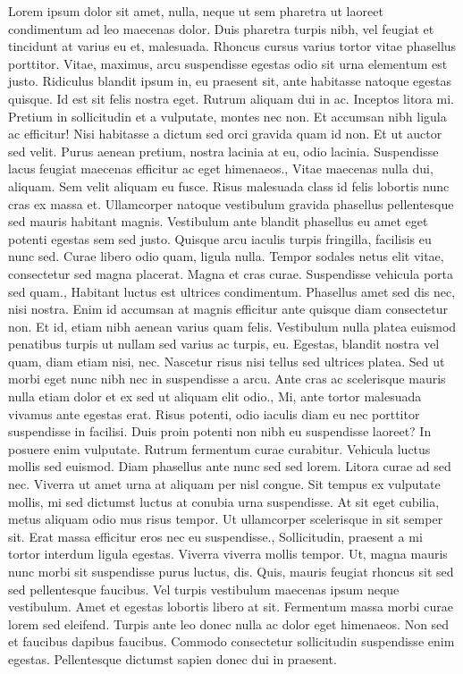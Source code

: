 \documentclass{source/tex/templates/maththesis}
\begin{document}
Lorem ipsum dolor sit amet, nulla, neque ut sem pharetra ut laoreet condimentum ad leo maecenas dolor. Duis pharetra turpis nibh, vel feugiat et tincidunt at varius eu et, malesuada. Rhoncus cursus varius tortor vitae phasellus porttitor. Vitae, maximus, arcu suspendisse egestas odio sit urna elementum est justo. Ridiculus blandit ipsum in, eu praesent sit, ante habitasse natoque egestas quisque. Id est sit felis nostra eget. Rutrum aliquam dui in ac. Inceptos litora mi. Pretium in sollicitudin et a vulputate, montes nec non. Et accumsan nibh ligula ac efficitur! Nisi habitasse a dictum sed orci gravida quam id non. Et ut auctor sed velit. Purus aenean pretium, nostra lacinia at eu, odio lacinia. Suspendisse lacus feugiat maecenas efficitur ac eget himenaeos., Vitae maecenas nulla dui, aliquam. Sem velit aliquam eu fusce. Risus malesuada class id felis lobortis nunc cras ex massa et. Ullamcorper natoque vestibulum gravida phasellus pellentesque sed mauris habitant magnis. Vestibulum ante blandit phasellus eu amet eget potenti egestas sem sed justo. Quisque arcu iaculis turpis fringilla, facilisis eu nunc sed. Curae libero odio quam, ligula nulla. Tempor sodales netus elit vitae, consectetur sed magna placerat. Magna et cras curae. Suspendisse vehicula porta sed quam., Habitant luctus est ultrices condimentum. Phasellus amet sed dis nec, nisi nostra. Enim id accumsan at magnis efficitur ante quisque diam consectetur non. Et id, etiam nibh aenean varius quam felis. Vestibulum nulla platea euismod penatibus turpis ut nullam sed varius ac turpis, eu. Egestas, blandit nostra vel quam, diam etiam nisi, nec. Nascetur risus nisi tellus sed ultrices platea. Sed ut morbi eget nunc nibh nec in suspendisse a arcu. Ante cras ac scelerisque mauris nulla etiam dolor et ex sed ut aliquam elit odio., Mi, ante tortor malesuada vivamus ante egestas erat. Risus potenti, odio iaculis diam eu nec porttitor suspendisse in facilisi. Duis proin potenti non nibh eu suspendisse laoreet? In posuere enim vulputate. Rutrum fermentum curae curabitur. Vehicula luctus mollis sed euismod. Diam phasellus ante nunc sed sed lorem. Litora curae ad sed nec. Viverra ut amet urna at aliquam per nisl congue. Sit tempus ex vulputate mollis, mi sed dictumst luctus at conubia urna suspendisse. At sit eget cubilia, metus aliquam odio mus risus tempor. Ut ullamcorper scelerisque in sit semper sit. Erat massa efficitur eros nec eu suspendisse., Sollicitudin, praesent a mi tortor interdum ligula egestas. Viverra viverra mollis tempor. Ut, magna mauris nunc morbi sit suspendisse purus luctus, dis. Quis, mauris feugiat rhoncus sit sed sed pellentesque faucibus. Vel turpis vestibulum maecenas ipsum neque vestibulum. Amet et egestas lobortis libero at sit. Fermentum massa morbi curae lorem sed eleifend. Turpis ante leo donec nulla ac dolor eget himenaeos. Non sed et faucibus dapibus faucibus. Commodo consectetur sollicitudin suspendisse enim egestas. Pellentesque dictumst sapien donec dui in praesent.
\end{document}
